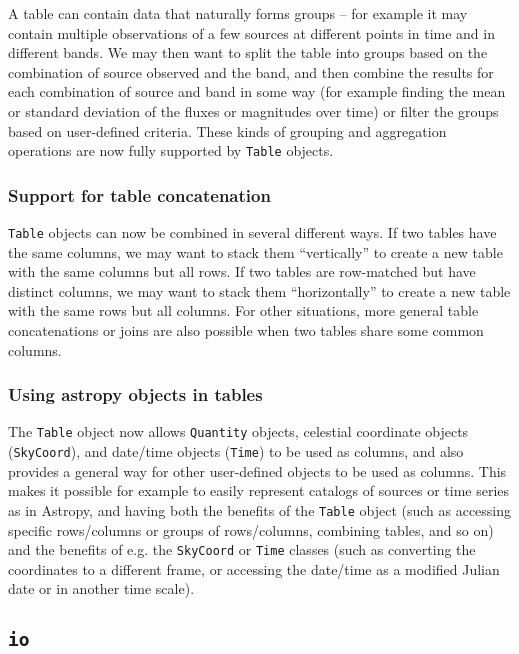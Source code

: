 \documentclass[modern]{aastex61}
\newcommand{\package}[1]{\texttt{#1}\xspace}
\begin{document}
A table can contain data that naturally forms groups -- for example it may
contain multiple observations of a few sources at different points in time
and in different bands. We may then want to split the table into groups based
on the combination of source observed and the band, and then combine the
results for each combination of source and band in some way (for example finding
the mean or standard deviation of the fluxes or magnitudes over time) or filter
the groups based on user-defined criteria. These kinds of grouping and
aggregation operations are now fully supported by \texttt{Table} objects.

\subsubsection{Support for table concatenation}

\texttt{Table} objects can now be combined in several different ways. If two
tables have the same columns, we may want to stack them ``vertically'' to create a
new table with the same columns but all rows. If two tables are row-matched but
have distinct columns, we may want to stack them ``horizontally'' to create a
new table with the same rows but all columns. For other situations, more general
table concatenations or joins are also possible when two tables share some
common columns.

\subsubsection{Using astropy objects in tables}

The \texttt{Table} object now allows \texttt{Quantity} objects, celestial
coordinate objects (\texttt{SkyCoord}), and date/time objects (\texttt{Time}) to
be used as columns, and also provides a general way for other user-defined
objects to be used as columns. This makes it possible for example to easily
represent catalogs of sources or time series as in Astropy, and having both the
benefits of the \texttt{Table} object (such as accessing specific rows/columns
or groups of rows/columns, combining tables, and so on) and the benefits of e.g.
the \texttt{SkyCoord} or \texttt{Time} classes (such as converting the
coordinates to a different frame, or accessing the date/time as a modified
Julian date or in another time scale).

\subsection{\package{io}}
\end{document}
